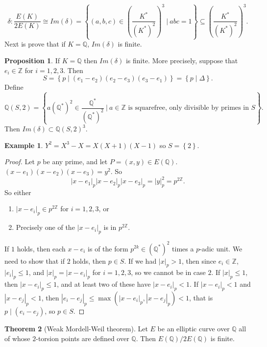 \documentclass{article}
\newcommand{\Z}{\mathbb{Z}}
\newcommand{\Q}{\mathbb{Q}}
\newcommand{\rb}[1]{\left( #1 \right)}
\newcommand{\cb}[1]{\left\{ #1 \right\}}
\newcommand{\abs}[1]{\left\lvert #1 \right\rvert}
\theoremstyle{definition}\newtheorem{definition}{Definition}[section]
\theoremstyle{definition}\newtheorem{remark}[definition]{Remark}
\theoremstyle{definition}\newtheorem*{example}{Example}
\theoremstyle{definition}\newtheorem*{note}{Note}
\newtheorem{proposition}[definition]{Proposition}
\newtheorem{theorem}[definition]{Theorem}
\begin{document}

$$ \delta : \dfrac{E\rb{K}}{2E\rb{K}} \cong Im\rb{\delta} = \cb{\rb{a, b, c} \in \rb{\dfrac{K^*}{\rb{K^*}^2}}^3 \ \Bigg| \ abc = 1} \subseteq \rb{\dfrac{K^*}{\rb{K^*}^2}}^3. $$
Next is prove that if $ K = \Q $, $ Im\rb{\delta} $ is finite.

\begin{proposition}
\label{prop:8.5}
If $ K = \Q $ then $ Im\rb{\delta} $ is finite. More precisely, suppose that $ e_i \in \Z $ for $ i = 1, 2, 3 $. Then
$$ S = \cb{p \mid \rb{e_1 - e_2}\rb{e_2 - e_3}\rb{e_3 - e_1}} = \cb{p \mid \Delta}. $$
Define
$$ \Q\rb{S, 2} = \cb{a\rb{\Q^*}^2 \in \dfrac{\Q^*}{\rb{\Q^*}^2} \ \Bigg| \ a \in \Z \text{ is squarefree, only divisible by primes in } S}. $$
Then $ Im\rb{\delta} \subset \Q\rb{S, 2}^3 $.
\end{proposition}

\begin{example}
$ Y^2 = X^3 - X = X\rb{X + 1}\rb{X - 1} $ so $ S = \cb{2} $.
\end{example}

\begin{proof}
Let $ p $ be any prime, and let $ P = \rb{x, y} \in E\rb{\Q} $. $ \rb{x - e_1}\rb{x - e_2}\rb{x - e_3} = y^2 $. So
$$ \abs{x - e_1}_p\abs{x - e_2}_p\abs{x - e_3}_p = \abs{y}_p^2 = p^{2\Z}. $$
So either
\begin{enumerate}
\item $ \abs{x - e_i}_p \in p^{2\Z} $ for $ i = 1, 2, 3 $, or
\item Precisely one of the $ \abs{x - e_i}_p $ is in $ p^{2\Z} $.
\end{enumerate}
If $ 1 $ holds, then each $ x - e_i $ is of the form $ p^{2k} \in \rb{\Q^*}^2 $ times a $ p $-adic unit. We need to show that if $ 2 $ holds, then $ p \in S $. If we had $ \abs{x}_p > 1 $, then since $ e_i \in \Z $, $ \abs{e_i}_p \le 1 $, and $ \abs{x}_p = \abs{x - e_i}_p $ for $ i = 1, 2, 3 $, so we cannot be in case $ 2 $. If $ \abs{x}_p \le 1 $, then $ \abs{x - e_i}_p \le 1 $, and at least two of these have $ \abs{x - e_i}_p < 1 $. If $ \abs{x - e_i}_p < 1 $ and $ \abs{x - e_j}_p < 1 $, then $ \abs{e_i - e_j}_p \le \max\rb{\abs{x - e_i}_p, \abs{x - e_j}_p} < 1 $, that is $ p \mid \rb{e_i - e_j} $, so $ p \in S $.
\end{proof}

\begin{theorem}[Weak Mordell-Weil theorem]
Let $ E $ be an elliptic curve over $ \Q $ all of whose $ 2 $-torsion points are defined over $ \Q $. Then $ E\rb{\Q} / 2E\rb{\Q} $ is finite.
\end{theorem}
\end{document}
